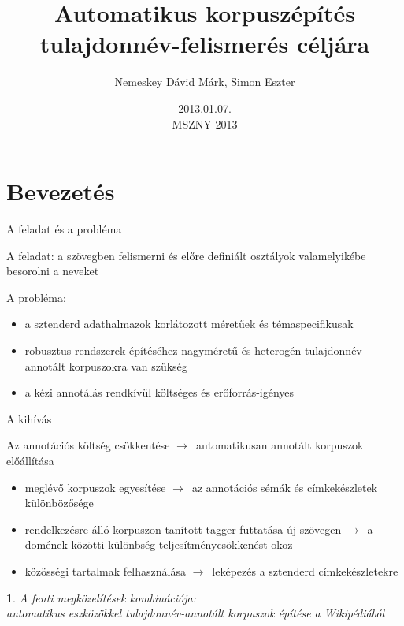 \documentclass[utf8x,t]{beamer}
\title %
{Automatikus korpuszépítés tulajdonnév-felismerés céljára}
\author %
{Nemeskey Dávid Márk\inst{1}, Simon Eszter\inst{2}}
\institute{\inst{1} MTA SZTAKI \\
\inst{2} MTA Nyelvtudományi Intézet} %
\date %
{2013.01.07. \\ MSZNY 2013}
\newcommand{\nyil}{$\rightarrow$\ }
\newtheorem{nix}{}[section]
\begin{document}
\begin{frame}{}
  \titlepage
\end{frame}

\section{Bevezetés}

\begin{frame}{A feladat és a probléma}

\bigskip

A feladat: a szövegben felismerni és előre definiált osztályok valamelyikébe besorolni a neveket 

\bigskip

A probléma:
\begin{itemize}
\item a sztenderd adathalmazok korlátozott méretűek és témaspecifikusak 
\item robusztus rendszerek építéséhez nagyméretű és heterogén tulajdonnév-annotált korpuszokra van szükség
\item a kézi annotálás rendkívül költséges és erőforrás-igényes
\end{itemize}

\end{frame}

\begin{frame}{A kihívás}

Az annotációs költség csökkentése \nyil automatikusan annotált korpuszok előállítása

\begin{itemize}
\item meglévő korpuszok egyesítése \nyil az annotációs sémák és címkekészletek különbözősége 
\item rendelkezésre álló korpuszon tanított tagger futtatása új szövegen \nyil a domének közötti különbség teljesítménycsökkenést okoz
\item közösségi tartalmak felhasználása \nyil leképezés a sztenderd címkekészletekre
\end{itemize}

\smallskip

\begin{nix}
A fenti megközelítések kombinációja: \\ automatikus eszközökkel tulajdonnév-annotált korpuszok építése a Wikipédiából
\end{nix}

\end{frame}
\end{document}
